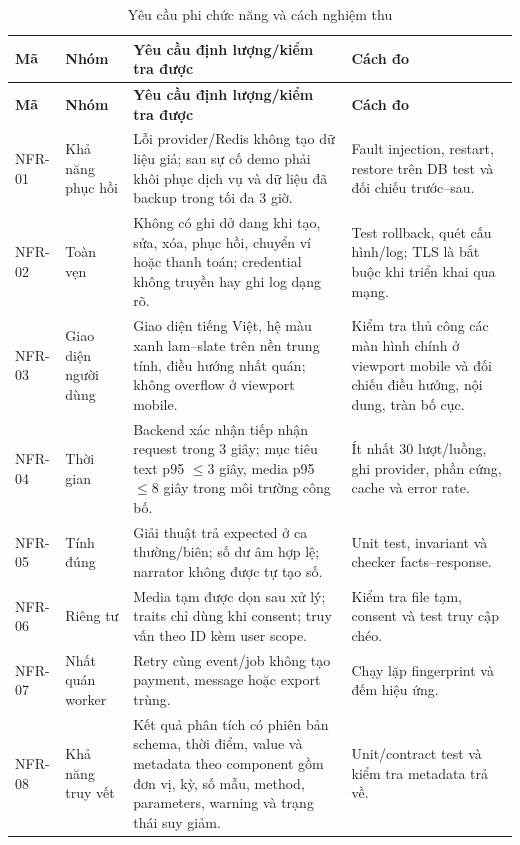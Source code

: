 \begin{longtable}{@{}L{1.3cm}L{3.0cm}L{5.8cm}L{3.8cm}@{}}
  \caption{Yêu cầu phi chức năng và cách nghiệm thu}\label{tab:nfr}\\
  \toprule
  \textbf{Mã} & \textbf{Nhóm} & \textbf{Yêu cầu định lượng/kiểm tra được} & \textbf{Cách đo} \\
  \midrule
  \endfirsthead
  \toprule
  \textbf{Mã} & \textbf{Nhóm} & \textbf{Yêu cầu định lượng/kiểm tra được} & \textbf{Cách đo} \\
  \midrule
  \endhead
  NFR-01 & Khả năng phục hồi & Lỗi provider/Redis không tạo dữ liệu giả; sau sự cố demo phải khôi phục dịch vụ và dữ liệu đã backup trong tối đa 3 giờ. & Fault injection, restart, restore trên DB test và đối chiếu trước--sau. \\
  NFR-02 & Toàn vẹn & Không có ghi dở dang khi tạo, sửa, xóa, phục hồi, chuyển ví hoặc thanh toán; credential không truyền hay ghi log dạng rõ. & Test rollback, quét cấu hình/log; TLS là bắt buộc khi triển khai qua mạng. \\
  NFR-03 & Giao diện người dùng & Giao diện tiếng Việt, hệ màu xanh lam--slate trên nền trung tính, điều hướng nhất quán; không overflow ở viewport mobile. & Kiểm tra thủ công các màn hình chính ở viewport mobile và đối chiếu điều hướng, nội dung, tràn bố cục. \\
  NFR-04 & Thời gian & Backend xác nhận tiếp nhận request trong 3 giây; mục tiêu text p95 $\leq3$ giây, media p95 $\leq8$ giây trong môi trường công bố. & Ít nhất 30 lượt/luồng, ghi provider, phần cứng, cache và error rate. \\
  NFR-05 & Tính đúng & Giải thuật trả expected ở ca thường/biên; số dư âm hợp lệ; narrator không được tự tạo số. & Unit test, invariant và checker facts--response. \\
  NFR-06 & Riêng tư & Media tạm được dọn sau xử lý; traits chỉ dùng khi consent; truy vấn theo ID kèm user scope. & Kiểm tra file tạm, consent và test truy cập chéo. \\
  NFR-07 & Nhất quán worker & Retry cùng event/job không tạo payment, message hoặc export trùng. & Chạy lặp fingerprint và đếm hiệu ứng. \\
  NFR-08 & Khả năng truy vết & Kết quả phân tích có phiên bản schema, thời điểm, value và metadata theo component gồm đơn vị, kỳ, số mẫu, method, parameters, warning và trạng thái suy giảm. & Unit/contract test và kiểm tra metadata trả về. \\
  \bottomrule
\end{longtable}

